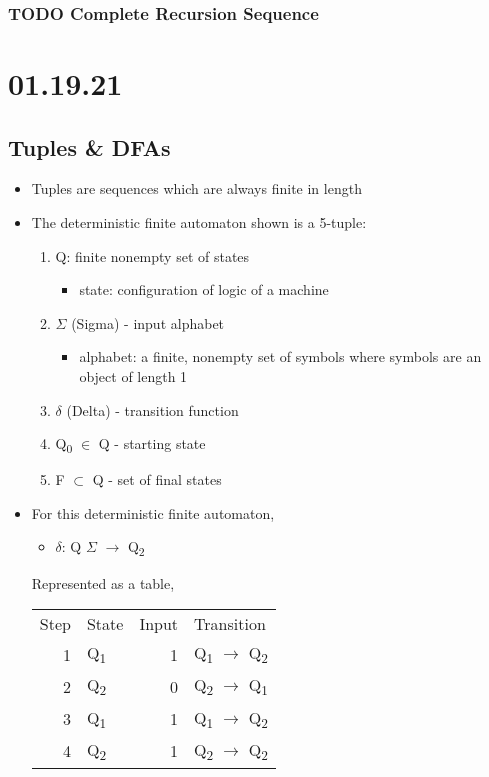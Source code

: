 \documentclass[11pt]{article}
\begin{document}
\subsubsection{{\bfseries\sffamily TODO} Complete Recursion Sequence}
\label{sec:orga7e8ac4}
\section{01.19.21}
\label{sec:orgc5a8c8a}
\subsection{Tuples \& DFAs}
\label{sec:org7f53ec8}
\begin{itemize}
\item Tuples are sequences which are always finite in length
\item The deterministic finite automaton shown is a 5-tuple:
\begin{enumerate}
\item Q: finite nonempty set of states
\begin{itemize}
\item state: configuration of logic of a machine
\end{itemize}
\item \(\Sigma\) (Sigma) - input alphabet
\begin{itemize}
\item alphabet: a finite, nonempty set of symbols where symbols are an object of length 1
\end{itemize}
\item \(\delta\) (Delta) - transition function
\item Q\textsubscript{0} \(\in\) Q - starting state
\item F \(\subset\) Q - set of final states
\end{enumerate}
\item For this deterministic finite automaton,
\begin{itemize}
\item \(\delta\): Q \texttimes{} \(\Sigma\) \(\to\) Q\textsubscript{2}
\end{itemize}
Represented as a table,
\begin{center}
\begin{tabular}{rlrl}
Step & State & Input & Transition\\
1 & Q\textsubscript{1} & 1 & Q\textsubscript{1} \(\to\) Q\textsubscript{2}\\
2 & Q\textsubscript{2} & 0 & Q\textsubscript{2} \(\to\) Q\textsubscript{1}\\
3 & Q\textsubscript{1} & 1 & Q\textsubscript{1} \(\to\) Q\textsubscript{2}\\
4 & Q\textsubscript{2} & 1 & Q\textsubscript{2} \(\to\) Q\textsubscript{2}\\
\end{tabular}
\end{center}
\end{itemize}
\end{document}
